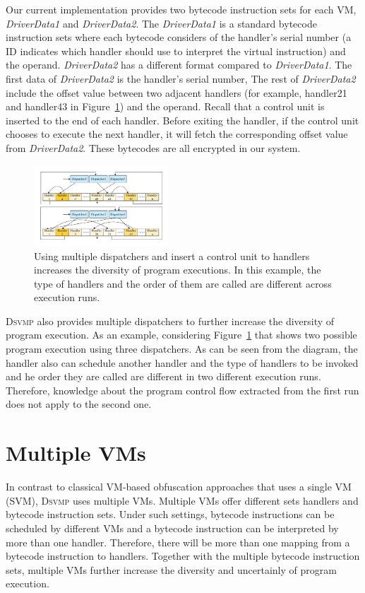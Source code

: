 \documentclass[conference]{IEEEtran}
\newcommand{\DSVMP}{\textsc{Dsvmp}\xspace}
\begin{document}
Our current implementation provides two bytecode instruction sets for each VM,
\emph{DriverData1} and \emph{DriverData2}. The \emph{DriverData1} is a
standard bytecode instruction sets where each bytecode considers of the
handler's serial number (a ID indicates which handler should use to
interpret the virtual instruction) and the operand. \emph{DriverData2} has a different
format compared to \emph{DriverData1}. The first data of \emph{DriverData2}
is the handler's serial number, The rest of \emph{DriverData2} include the
offset value between two adjacent handlers (for example, handler21 and handler43 in Figure~\ref{fig:Fig.3}) and the operand.
Recall that a control unit is inserted to the end of each handler. Before exiting the handler,
if the control unit chooses to execute the next handler, it will fetch the corresponding offset value from \emph{DriverData2}.
These bytecodes are all encrypted in our system.

\begin{figure}[t]
  \centering
  \includegraphics[width=0.45\textwidth]{figure/figdh.pdf}
  \vspace{-1mm}
  \caption{Using multiple dispatchers and insert a control unit to handlers increases the diversity of program executions. In this example, the type of handlers and the order of them are called are different across execution runs. }\label{fig:Fig.3}
  \vspace{-5mm}
\end{figure}

\DSVMP also provides multiple dispatchers to further increase the diversity
of program execution. As an example, considering Figure~\ref{fig:Fig.3} that
shows two possible program execution using three dispatchers. As can be seen
from the diagram, the handler also can schedule another handler and the type of handlers
to be invoked and he order they are called are different in two different execution runs.
Therefore, knowledge about the program control flow extracted from the first run does not apply to the second one.


\section{Multiple VMs \label{sec:mvm}}
In contrast to classical VM-based obfuscation approaches that uses a single VM (SVM), \DSVMP uses multiple VMs.
Multiple VMs offer different sets handlers and bytecode instruction sets. Under such settings,
bytecode instructions can be scheduled by different VMs and a bytecode instruction can be interpreted by more than one handler.
Therefore, there will be more than one mapping from a bytecode instruction to handlers.
Together with the multiple bytecode instruction sets, multiple VMs further increase the diversity and uncertainly of program execution.
\end{document}
